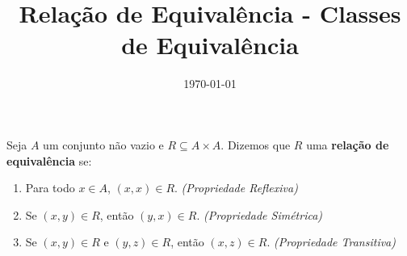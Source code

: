 \documentclass{beamer}
\title{Rela\c{c}\~ao de Equival\^encia - Classes de Equivalência}
\author[\autor]{\autor}
\institute[\instituto]{\instituto}
\date{\today}
\begin{document}
    \begin{frame}
        \maketitle
    \end{frame}


    \begin{frame}
        \begin{definicao}
            Seja $A$ um conjunto n{\~a}o vazio \pause e $R\subseteq A \times A$. \pause Dizemos que $R$  uma \textbf{rela{\c c}{\~a}o de equival{\^e}ncia} se:\pause
            \begin{enumerate}[label={\roman*})]
                \item Para todo $x \in A$, \pause $(x,x) \in R$. \pause \textit{(Propriedade Reflexiva)}\pause\vspace{.2cm}

                \item Se $(x, y) \in R$, \pause ent\~ao $(y, x) \in R$. \pause \textit{(Propriedade Sim\'etrica)}\pause\vspace{.2cm}
                
                \item Se $(x, y) \in R$ \pause e $(y, z) \in R$, \pause ent\~ao $(x, z)\in R$. \pause \textit{(Propriedade Transitiva)}\pause
            \end{enumerate}
        \end{definicao}
    \end{frame}
\end{document}
